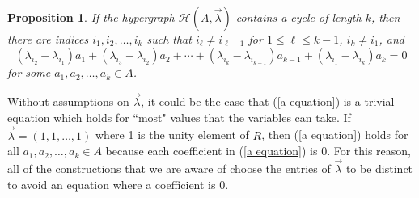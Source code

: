 \documentclass[12pt]{article}%
\newtheorem{proposition}[theorem]{Proposition}
\newenvironment{proof}[1][Proof]{\noindent\textbf{#1.} }
{\hfill \ \rule{0.5em}{0.5em}}
\begin{document}
\begin{proposition}\label{prop:cycle equations} 
If the hypergraph $\mathcal{H}( A , \vec{ \lambda} )$ contains a cycle of length $k$, then there are indices $i_1,i_2, \dots ,i_k$ such that 
$i_\ell \not = i_{\ell+1}$ for $1\leq \ell \leq k-1$, $i_k\not = i_1$, and 
\begin{equation}\label{a equation}
(\lambda_{i_2} - \lambda_{i_1})a_1 + (\lambda_{i_3}- \lambda_{i_2})a_2 + \cdots + (\lambda_{i_k} - \lambda_{i_{k-1}})a_{k-1} + (\lambda_{i_1} - \lambda_{i_k})a_k = 0
\end{equation}
for some $a_1,a_2, \dots , a_k \in A$.  
\end{proposition}

Without assumptions on $\vec{\lambda}$, it could be the case that (\ref{a equation}) is a trivial equation 
which holds for ``most" values that the variables can take.  
If $\vec{\lambda} = (1, 1, \dots , 1)$ where 1 is the unity element of $R$, 
then (\ref{a equation}) holds for all $a_1,a_2, \dots , a_k \in A$ because each coefficient in (\ref{a equation}) is 0.  
For this reason, all of the constructions that we are aware of choose 
the entries of $\vec{ \lambda}$ to be distinct to avoid an equation where a coefficient is 0.  
\end{document}
